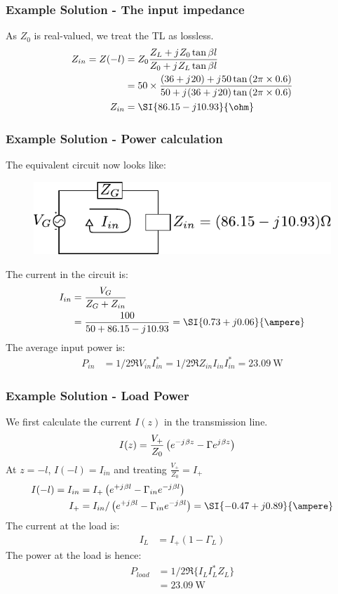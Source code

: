 \documentclass[10pt, compress]{beamer}
\renewcommand{\j}{{j}\mkern1mu} %
\begin{document}
\begin{frame}
  \frametitle{Example Solution - The input impedance}

  As $Z_0$ is real-valued, we treat the TL as lossless.
  \begin{align*}
    Z_{in} = Z(-l) &= Z_0 \frac{Z_L + \j Z_0 \tan{\beta l}}{Z_0 + \j Z_L \tan{\beta l}}  \\
    &= 50 \times \frac{(36 + \j 20) + \j 50 \tan{(2 \pi \times 0.6)}}{50 +  \j (36 + \j 20) \tan{(2 \pi \times 0.6)}} \\
    Z_{in}&= \SI{86.15 - j10.93}{\ohm}
  \end{align*}

  
\end{frame}
\begin{frame}
  \frametitle{Example Solution - Power calculation}

  The equivalent circuit now looks like:
  \begin{figure}[H!]
    \centering
    \includegraphics[width=.6\textwidth]{tline_terminated_example_power.pdf}
  \end{figure}
  The current in the circuit is:
  \begin{align*}
    I_{in} &= \frac{V_G}{Z_G + Z_{in}} \\
    &= \frac{100}{50 + 86.15 - \j 10.93} = \SI{0.73 + j 0.06}{\ampere}
  \end{align*}
  The average input power is:
  \begin{align*}
    P_{in} &= 1/2 \Re{V_{in} I_{in}^*} = 1/2 \Re{Z_{in} I_{in} I_{in}^*} = \SI{23.09}{\watt} 
  \end{align*}

\end{frame}
\begin{frame}
  \frametitle{Example Solution - Load Power}
We first calculate the current $I(z)$ in the transmission line.
\begin{align*}
  I(z) &= \frac{V_{+}}{Z_0} \left( e^{-\j \beta z} - \Gamma e^{\j \beta z}\right) 
\end{align*}
At $z = -l$, $I(-l) = I_{in}$ and treating $\frac{V_{+}}{Z_0} = I_{+}$
\begin{align*}
  I(-l) = I_{in} &= I_{+} \left( e^{+\j \beta l} - \Gamma_{in} e^{-\j \beta l}\right) \\
  I_{+} &= I_{in}/\left( e^{+\j \beta l} - \Gamma_{in} e^{-\j \beta l}\right)  = \SI{-0.47 + j 0.89}{\ampere}
\end{align*}
The current at the load is:
\begin{align*}
  I_L &= I_{+}(1 - \Gamma_L)
\end{align*}
The power at the load is hence:
\begin{align*}
  P_{load} &= 1/2 \Re\{I_{L} I_{L }^*Z_L\} \\
    &= \SI{23.09}{\watt}
\end{align*}
\end{frame}
\end{document}
